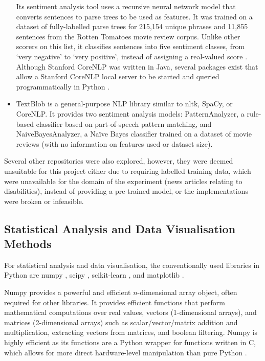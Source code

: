 \documentclass{report}
\begin{document}
\begin{itemize}
		Its sentiment analysis tool uses a recursive neural network model that converts sentences to parse trees to be used as features. 
		It was trained on a dataset of fully-labelled parse trees for 215,154 unique phrases and 11,855 sentences from the Rotten Tomatoes movie review corpus. 
		Unlike other scorers on this list, it classifies sentences into five sentiment classes, from `very negative' to `very positive', instead of assigning a real-valued score \cite{socher2013recursive}.
		Although Stanford CoreNLP was written in Java, several packages exist that allow a Stanford CoreNLP local server to be started and queried programmatically in Python \cite{stanfordcorenlp}.
	\item TextBlob \cite{textblob} is a general-purpose NLP library similar to nltk, SpaCy, or CoreNLP.
		It provides two sentiment analysis models: PatternAnalyzer, a rule-based classifier based on part-of-speech pattern matching, and NaiveBayesAnalyzer, a Na\"{i}ve Bayes classifier trained on a dataset of movie reviews (with no information on features used or dataset size). 
\end{itemize}

Several other repositories were also explored, however, they were deemed unsuitable for this project either due to requiring labelled training data, which were unavailable for the domain of the experiment (news articles relating to disabilities), instead of providing a pre-trained model, or the implementations were broken or infeasible.

\subsection{Statistical Analysis and Data Visualisation Methods} \label{tc-visualisation}
For statistical analysis and data visualisation, the conventionally used libraries in Python are numpy \cite{Numpy}, scipy \cite{Scipy}, scikit-learn \cite{Scikit-learn}, and matplotlib \cite{Matplotlib}.

Numpy \cite{Numpy} provides a powerful and efficient $n$-dimensional array object, often required for other libraries.
It provides efficient functions that perform mathematical computations over real values, vectors (1-dimensional arrays), and matrices (2-dimensional arrays) such as scalar/vector/matrix addition and multiplication, extracting vectors from matrices, and boolean filtering.
Numpy is highly efficient as its functions are a Python wrapper for functions written in C, which allows for more direct hardware-level manipulation than pure Python \cite{Numpy-c}.
\end{document}

